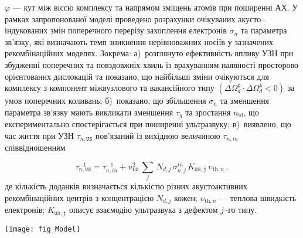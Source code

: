$\varphi$ --- кут між віссю комплексу та напрямом зміщень атомів при поширенні АХ.
У рамках запропонованої моделі проведено розрахунки очікуваних акусто--індукованих змін поперечного перерізу захоплення електронів $\sigma_{n}$ та параметра зв'язку,
які визначають темп зникнення нерівноважних носіїв
у зазначених рекомбінаційних моделях.
Зокрема:
а)~розглянуто ефективність впливу УЗН при збудженні поперечних та повздовжніх хвиль із врахуванням наявності просторово орієнтованих дислокацій та показано, що найбільші зміни очікуються для
   комплексу з компонент міжвузлового та вакансійного типу $(\Delta\Omega_d^\mathtt{D}\cdot\Delta\Omega_d^\mathtt{A}<0)$
 за умов поперечних коливань;
б)~показано, що збільшення $\sigma_{n}$ та зменшення параметра зв'язку мають викликати зменшення $\tau_g$ та зростання $n_\mathrm{id}$, що експериментально спостерігається при поширенні ультразвуку;
в)~виявлено, що час життя при УЗН $\tau_{n,\mathtt{US}}$ пов'язаний із вихідною величиною $\tau_{n,in}$ співвідношенням



\begin{equation}
\label{eqEpsSigUSA}
\tau_{n,\mathtt{US}}^{-1}=
\tau_{n,in}^{-1}+u_{\mathtt{US}}^2\,\sum_j\,N_{d,j}\,\sigma_{n,j}^{in}\,K_\mathtt{US,j}\,\upsilon_{\mathrm{th},n}\,,
\end{equation}
де
кількість доданків визначається кількістю різних
акустоактивних рекомбінаційних центрів
з концентрацією $N_{d,j}$ кожен;
$\upsilon_{\mathrm{th},n}$ --- теплова швидкість електронів;
$K_\mathtt{US,j}$ описує взаємодію ультразвука з дефектом $j$--го типу.



\begin{SCfigure}[1.0]
\texttt{[image: fig\_Model]}
\caption{\label{fig_Model}
\FigModelCaption
}
\end{SCfigure}



